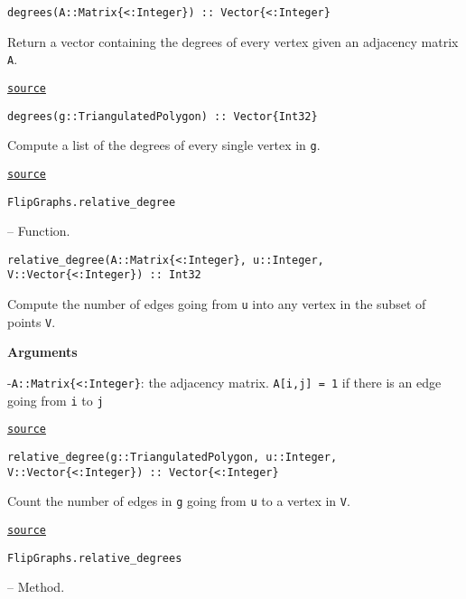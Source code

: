 \begin{adjustwidth}{2em}{0pt}


\begin{verbatim}
degrees(A::Matrix{<:Integer}) :: Vector{<:Integer}
\end{verbatim}

Return a vector containing the degrees of every vertex given an adjacency matrix \texttt{A}.



\href{https://github.com/schto223/FlipGraphs.jl/blob/490c01a7adf74b42f27dda05099165c47ae8133e/src/generalUtilities.jl#L191-L195}{\texttt{source}}



\begin{verbatim}
degrees(g::TriangulatedPolygon) :: Vector{Int32}
\end{verbatim}

Compute a list of the degrees of every single vertex in \texttt{g}.



\href{https://github.com/schto223/FlipGraphs.jl/blob/490c01a7adf74b42f27dda05099165c47ae8133e/src/polygonTriangulations.jl#L222-L226}{\texttt{source}}


\end{adjustwidth}
\hypertarget{16388680941512068090}{\texttt{FlipGraphs.relative\_degree}}  -- {Function.}

\begin{adjustwidth}{2em}{0pt}


\begin{verbatim}
relative_degree(A::Matrix{<:Integer}, u::Integer, V::Vector{<:Integer}) :: Int32
\end{verbatim}

Compute the number of edges going from \texttt{u} into any vertex in the subset of points \texttt{V}.

\textbf{Arguments}

-\texttt{A::Matrix\{<:Integer\}}: the adjacency matrix. \texttt{A[i,j] = 1} if there is an edge going from \texttt{i} to \texttt{j}



\href{https://github.com/schto223/FlipGraphs.jl/blob/490c01a7adf74b42f27dda05099165c47ae8133e/src/generalUtilities.jl#L250-L257}{\texttt{source}}



\begin{verbatim}
relative_degree(g::TriangulatedPolygon, u::Integer, V::Vector{<:Integer}) :: Vector{<:Integer}
\end{verbatim}

Count the number of edges in \texttt{g} going from \texttt{u} to a vertex in \texttt{V}.



\href{https://github.com/schto223/FlipGraphs.jl/blob/490c01a7adf74b42f27dda05099165c47ae8133e/src/flipGraphPlanar.jl#L395-L399}{\texttt{source}}


\end{adjustwidth}
\hypertarget{17468080694136774284}{\texttt{FlipGraphs.relative\_degrees}}  -- {Method.}

